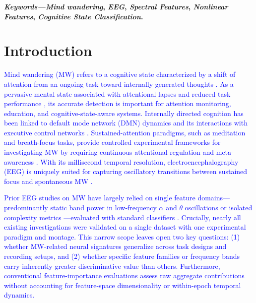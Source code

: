 \documentclass[conference]{IEEEtran}
\begin{document}
\textbf{\textit{Keywords---}\textit{Mind wandering}, \textit{EEG}, \textit{Spectral Features}, \textit{Nonlinear Features}, \textit{Cognitive State Classification}.}
 
\section{Introduction}

\textcolor{blue}{Mind wandering (MW) refers to a cognitive state characterized by a shift of attention from an ongoing task toward internally generated thoughts \cite{smallwood2013restless,killingsworth2010wandering}. As a pervasive mental state associated with attentional lapses and reduced task performance \cite{killingsworth2010wandering}, its accurate detection is important for attention monitoring, education, and cognitive-state-aware systems. Internally directed cognition has been linked to default mode network (DMN) dynamics \cite{raichle2001default} and its interactions with executive control networks \cite{christoff2016mind}. Sustained-attention paradigms, such as meditation and breath-focus tasks, provide controlled experimental frameworks for investigating MW by requiring continuous attentional regulation and meta-awareness \cite{lutz2008attention,tang2015neuroscience,cahn2013meditation}. With its millisecond temporal resolution, electroencephalography (EEG) is uniquely suited for capturing oscillatory transitions between sustained focus and spontaneous MW \cite{KAM2022119372,rodlarios}.}

\textcolor{blue}{Prior EEG studies on MW have largely relied on single feature domains---predominantly static band power in low-frequency $\alpha$ and $\theta$ oscillations \cite{KAM2022119372,rodlarios} or isolated complexity metrics \cite{lu2022nonlinear,berkovich2012mindfulness}---evaluated with standard classifiers \cite{jin2020distinguishing,compton2019wandering,hosseini2019deep}. Crucially, nearly all existing investigations were validated on a single dataset with one experimental paradigm and montage. This narrow scope leaves open two key questions: (1) whether MW-related neural signatures generalize across task designs and recording setups, and (2) whether specific feature families or frequency bands carry inherently greater discriminative value than others. Furthermore, conventional feature-importance evaluations assess raw aggregate contributions without accounting for feature-space dimensionality or within-epoch temporal dynamics.}
\end{document}
